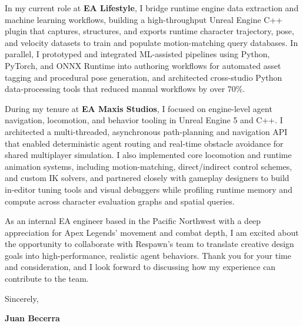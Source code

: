 \documentclass[letterpaper,11pt]{article}
\begin{document}
In my current role at \textbf{EA Lifestyle}, I bridge runtime engine data extraction and machine 
learning workflows, building a high-throughput Unreal Engine C++ plugin that captures, structures, 
and exports runtime character trajectory, pose, and velocity datasets to train and populate 
motion-matching query databases. In parallel, I prototyped and integrated ML-assisted pipelines 
using Python, PyTorch, and ONNX Runtime into authoring workflows for automated asset tagging and 
procedural pose generation, and architected cross-studio Python data-processing tools that reduced 
manual workflows by over 70\%.

During my tenure at \textbf{EA Maxis Studios}, I focused on engine-level agent navigation, 
locomotion, and behavior tooling in Unreal Engine 5 and C++. I architected a multi-threaded, 
asynchronous path-planning and navigation API that enabled deterministic agent routing and 
real-time obstacle avoidance for shared multiplayer simulation. I also implemented core locomotion 
and runtime animation systems, including motion-matching, direct/indirect control schemes, and 
custom IK solvers, and partnered closely with gameplay designers to build in-editor tuning tools 
and visual debuggers while profiling runtime memory and compute across character evaluation graphs 
and spatial queries.

As an internal EA engineer based in the Pacific Northwest with a deep appreciation for Apex 
Legends' movement and combat depth, I am excited about the opportunity to collaborate with 
Respawn's team to translate creative design goals into high-performance, realistic agent behaviors. 
Thank you for your time and consideration, and I look forward to discussing how my experience can 
contribute to the team.

\vspace{10pt}
\noindent Sincerely,

\vspace{14pt}
\noindent \textbf{Juan Becerra}
\end{document}
